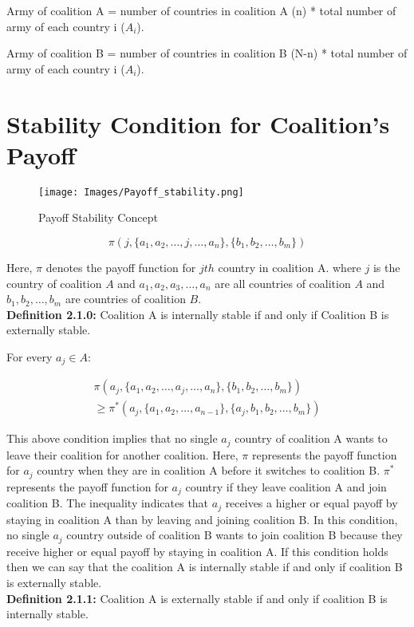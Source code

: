 \documentclass[oneside,12pt]{report}
\begin{document}
Army of coalition A = number of countries in coalition A (n) * total number of army of each country i (\(A_i\)).

Army of coalition B = number of countries in coalition B (N-n) * total number of army of each country i (\(A_i\)).

\section{Stability Condition for Coalition's Payoff}

\begin{figure}[h]
    \centering
    \texttt{[image: Images/Payoff\_stability.png]}
    \caption{Payoff Stability Concept}
    \label{fig:2.1.1}
\end{figure}


\[
\pi\left(j, \{a_1, a_2, \ldots, j, \ldots ,a_n\}, \{b_1, b_2, \ldots, b_m\}\right)
\]

Here, $\pi$ denotes the payoff function for \(jth\) country in coalition A. where \(j\) is the country of coalition \(A\) and \(a_1, a_2, a_3, \ldots, a_n\) are all countries of coalition \(A\) and \(b_1, b_2, \ldots, b_m\) are countries of coalition \(B\).
\\[2em]
\textbf{Definition 2.1.0:} Coalition A is internally stable if and only if Coalition B is externally stable.

For every $a_j \in A$:

\begin{equation}
\begin{split}
\pi\left(a_j, \{a_1, a_2, \ldots, a_j, \ldots, a_n\}, \{b_1, b_2, \ldots, b_m\}\right) \\
\geq \pi^*\left(a_j, \{a_1, a_2, \ldots, a_{n-1}\}, \{a_j, b_1, b_2, \ldots, b_m\}\right)
\end{split}
\end{equation}

This above condition implies that no single \(a_j\) country of coalition A wants to leave their coalition for another coalition. Here, $\pi$ represents the payoff function for \(a_j\) country when they are in coalition A before it switches to coalition B. $\pi^*$ represents the payoff function for \(a_j\) country if they leave coalition A and join coalition B. The inequality indicates that \(a_j\) receives a higher or equal payoff by staying in coalition A than by leaving and joining coalition B. In this condition, no single \(a_j\) country outside of coalition B wants to join coalition B because they receive higher or equal payoff by staying in coalition A. If this condition holds then we can say that the coalition A is internally stable if and only if coalition B is externally stable.
\\[2em]
\textbf{Definition 2.1.1:} Coalition A is externally stable if and only if coalition B is internally stable.
\end{document}

